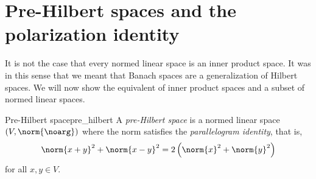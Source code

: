 \section{Pre-Hilbert spaces and the polarization identity}
It is not the case that every normed linear space is an inner product space. It was in this sense that we meant that Banach spaces are a generalization of Hilbert spaces. We will now show the equivalent of inner product spaces and a subset of normed linear spaces.
\begin{definition}{Pre-Hilbert space}{pre_hilbert}
    A \emph{pre-Hilbert space} is a normed linear space \((V, \norm{\noarg})\) where the norm satisfies the \emph{parallelogram identity}, that is,
    \begin{equation*}
        \norm{x + y}^2 + \norm{x - y}^2 = 2\left(\norm{x}^2 + \norm{y}^2\right)
    \end{equation*}
    for all \(x, y \in V\).
\end{definition}

